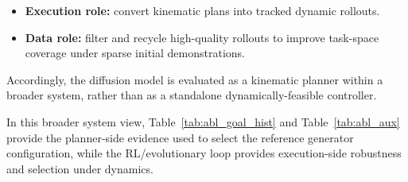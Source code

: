 \begin{itemize}
The RL--evolutionary stack has two practical roles in this thesis:
\begin{itemize}
    \item \textbf{Execution role:} convert kinematic plans into tracked dynamic rollouts.
    \item \textbf{Data role:} filter and recycle high-quality rollouts to improve task-space coverage under sparse initial demonstrations.
\end{itemize}

Accordingly, the diffusion model is evaluated as a kinematic planner within a broader system, rather than as a standalone dynamically-feasible controller.

In this broader system view, Table~\ref{tab:abl_goal_hist} and Table~\ref{tab:abl_aux} provide the planner-side evidence used to select the reference generator configuration, while the RL/evolutionary loop provides execution-side robustness and selection under dynamics.

    \item \textbf{Execution role:} convert kinematic plans into tracked dynamic rollouts.
    \item \textbf{Data role:} filter and recycle high-quality rollouts to improve task-space coverage under sparse initial demonstrations.
\end{itemize}

Accordingly, the diffusion model is evaluated as a kinematic planner within a broader system, rather than as a standalone dynamically-feasible controller.

In this broader system view, Table~\ref{tab:abl_goal_hist} and Table~\ref{tab:abl_aux} provide the planner-side evidence used to select the reference generator configuration, while the RL/evolutionary loop provides execution-side robustness and selection under dynamics.
